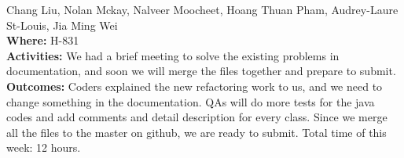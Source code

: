 \documentclass[12pt]{article}
\begin{document}
Chang Liu, Nolan Mckay, Nalveer Moocheet, Hoang Thuan Pham, Audrey-Laure St-Louis, Jia Ming Wei\\
{\bf Where:} H-831\\
{\bf Activities:} We had a brief meeting to solve the existing problems in documentation, and soon we will merge the files together and prepare to submit.\\ 
{\bf Outcomes:} Coders explained the new refactoring work to us, and we need to change something in the documentation. QAs will do more tests for the java codes and add comments and detail description for every class. Since we merge all the files to the master on github, we are ready to submit. Total time of this week: 12 hours.\\
\end{document}
